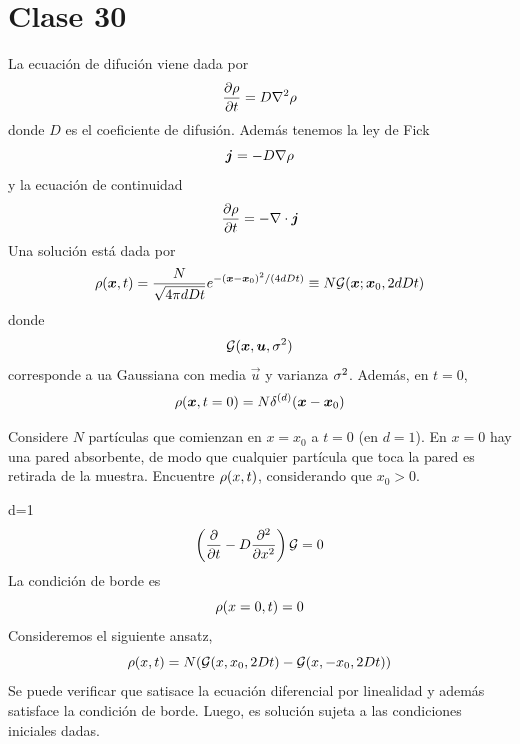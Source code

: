 \section{Clase 30}
La ecuación de difución viene dada por
\begin{equation}
  \pdv{\rho}{t}=D \nabla^2\rho 
\end{equation}
donde $D$ es el coeficiente de difusión. Además tenemos la ley de Fick
\begin{equation}
  \vb*{j} =-D\nabla\rho 
\end{equation}
y la ecuación de continuidad
\begin{equation}
  \pdv{\rho}{t}=-\nabla\cdot\vb*{j}
\end{equation}
Una solución está dada por
\begin{equation}
  \rho(\vb*{x},t)=\frac{N}{\sqrt{4\pi dDt}}e^{-(\vb*{x}-\vb*{x}_0)^2/(4dDt)}\equiv N\mathcal{G}(\vb*{x};\vb*{x}_0,2dDt)
\end{equation}
donde
\begin{equation}
  \mathcal{G}(\vb*{x},\vb*{u},\sigma^2)
\end{equation}
 corresponde a ua Gaussiana con media $\vec{u}$ y varianza $\sigma^2$. Además, en $t=0$,
 \begin{equation}
  \rho(\vb*{x},t=0)=N\delta^{(d)}(\vb*{x}-\vb*{x}_0)
\end{equation}

\begin{ej}
	Considere $N$ partículas que comienzan en $x=x_0$ a $t=0$ (en $d=1$). En $x=0$ hay una pared absorbente, de modo que cualquier partícula que toca la pared es retirada de la muestra. Encuentre $\rho(x,t)$, considerando que $x_0>0$.
\end{ej}
\begin{sol}
	d=1
	\begin{equation}
  \left(\pdv{t}-D\pdv[2]{x}\right)\mathcal{G}=0
\end{equation}
La condición de borde es
\begin{equation}
  \rho(x=0,t)=0
\end{equation}
Consideremos el siguiente ansatz,
\begin{equation}
  \rho(x,t)=N(\mathcal{G}(x,x_0,2Dt)-\mathcal{G}(x,-x_0,2Dt))
\end{equation}
Se puede verificar que satisace la ecuación diferencial por linealidad y además satisface la condición de borde. Luego, es solución sujeta a las condiciones iniciales dadas.
\end{sol}

